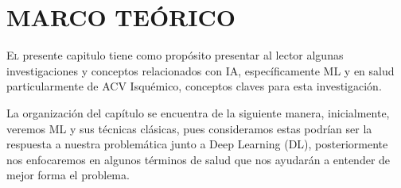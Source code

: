 \doublespacing
\chapter{MARCO TEÓRICO}
\label{sec:marco teorico}
\lettrine[lines=4, slope=0.2em, findent=0.2em, nindent=0.6em]{E}l presente capitulo tiene como propósito presentar al lector algunas investigaciones y conceptos relacionados con IA, específicamente ML y en salud particularmente de ACV Isquémico, conceptos claves para esta investigación. \\
\par La organización del capítulo se encuentra de la siguiente manera, inicialmente, veremos ML y sus técnicas clásicas, pues consideramos estas podrían ser la respuesta a nuestra problemática junto a Deep Learning (DL), posteriormente nos enfocaremos en algunos términos de salud que nos ayudarán a entender de mejor forma el problema. 
\\

\doublespacing
